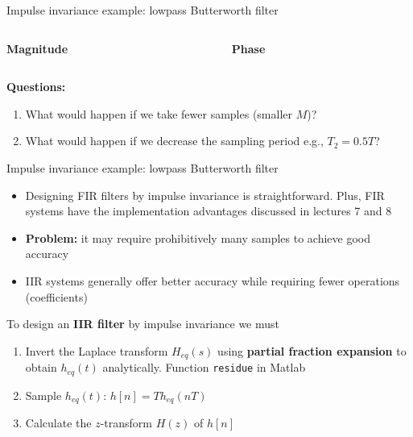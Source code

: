 \documentclass[10pt]{beamer}
\begin{document}
%
\begin{frame}{Impulse invariance example: lowpass Butterworth filter}

\begin{columns}
	\begin{column}{0.5\textwidth}
		\textbf{Magnitude}
		\begin{center}
			\resizebox{\linewidth}{!}{}
		\end{center}
	\end{column}
	\begin{column}{0.5\textwidth}
		\textbf{Phase}
		\begin{center}
			\resizebox{\linewidth}{!}{}
		\end{center}
	\end{column}
\end{columns}

\vspace{0.2cm}
\textbf{Questions:}
\begin{enumerate}
	\item What would happen if we take fewer samples (smaller $M$)?
	\item What would happen if we decrease the sampling period e.g., $T_2 = 0.5T$?
\end{enumerate}

\end{frame}

%
\begin{frame}{Impulse invariance example: lowpass Butterworth filter}

\begin{itemize}
	\item Designing FIR filters by impulse invariance is straightforward. Plus, FIR systems have the implementation advantages discussed in lectures 7 and 8
	\item \textbf{Problem:} it may require prohibitively many samples to achieve good accuracy
	\item IIR systems generally offer better accuracy while requiring fewer operations (coefficients)
\end{itemize}

To design an \textbf{IIR filter} by impulse invariance we must

\begin{enumerate}
	\item Invert the Laplace transform $H_{eq}(s)$ using \textbf{partial fraction expansion} to obtain $h_{eq}(t)$ analytically. Function \texttt{residue} in Matlab	
	\item Sample $h_{eq}(t)$: $h[n] = Th_{eq}(nT)$
	\item Calculate the $z$-transform $H(z)$ of $h[n]$
\end{enumerate}
\end{frame}
\end{document}

